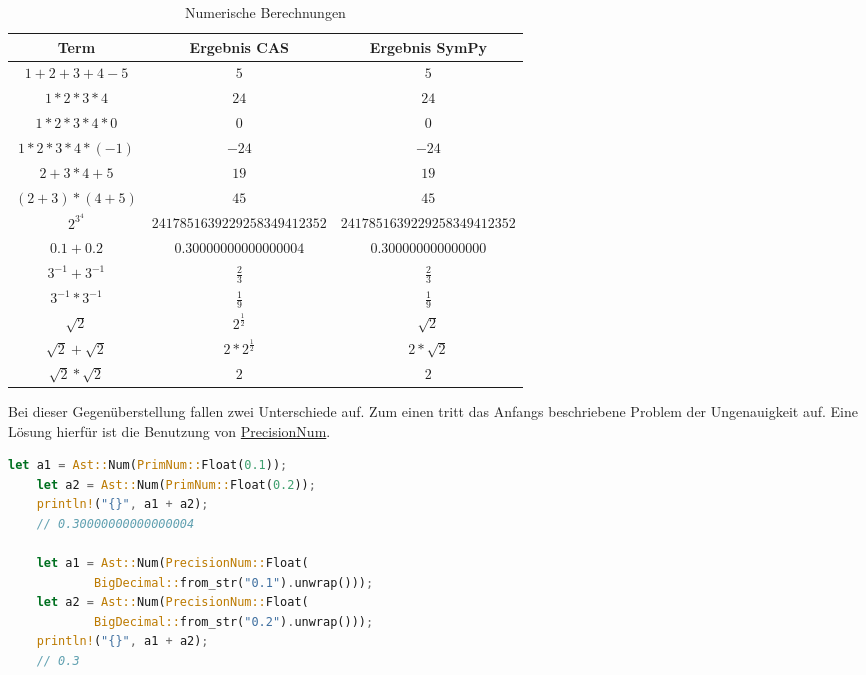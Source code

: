 \documentclass[11pt,a4paper, ngerman]{article}
\begin{document}
\begin{table}[h!]
    \caption{Numerische Berechnungen}
    \centering
    \begin{tabular}{|c|c|c|}
        \hline
        \textbf{Term} & \textbf{Ergebnis CAS} & \textbf{Ergebnis SymPy} \\
        \hline
        $1+2+3+4-5$ & $5$ & $5$ \\
        \hline
        $1*2*3*4$ & $24$ & $24$ \\
        \hline
        $1*2*3*4*0$ & $0$ & $0$ \\
        \hline
        $1*2*3*4*(-1)$ & $-24$ & $-24$ \\
        \hline
        $2+3*4+5$ & $19$ & $19$ \\
        \hline
        $(2+3)*(4+5)$ & $45$ & $45$ \\
        \hline
        $2^{3^4}$ & $2417851639229258349412352$ & $2417851639229258349412352$ \\
        \hline
        $0.1+0.2$ & $0.30000000000000004$ & $0.300000000000000$ \\
        \hline
        $3^{-1} + 3^{-1}$ & $\frac{2}{3}$ & $\frac{2}{3}$ \\
        \hline
        $3^{-1} * 3^{-1}$ & $\frac{1}{9}$ & $\frac{1}{9}$ \\
        \hline
        $\sqrt{2}$ & $2^\frac{1}{2}$ & $\sqrt{2}$ \\
        \hline
        $\sqrt{2}+\sqrt{2}$ & $2*2^\frac{1}{2}$ &  $2*\sqrt{2}$ \\
        \hline
        $\sqrt{2}*\sqrt{2}$ & $2$ & $2$ \\
        \hline
    \end{tabular}
\end{table}

Bei dieser Gegenüberstellung fallen zwei Unterschiede auf. Zum einen tritt das Anfangs beschriebene Problem der Ungenauigkeit auf. Eine Lösung hierfür ist die Benutzung von \hyperref[sec:NumTypes]{PrecisionNum}.

\begin{lstlisting}[language=rust, caption={PrimNum vs. PrecisionNum}]
    let a1 = Ast::Num(PrimNum::Float(0.1));
    let a2 = Ast::Num(PrimNum::Float(0.2));
    println!("{}", a1 + a2);
    // 0.30000000000000004

    let a1 = Ast::Num(PrecisionNum::Float(
            BigDecimal::from_str("0.1").unwrap()));
    let a2 = Ast::Num(PrecisionNum::Float(
            BigDecimal::from_str("0.2").unwrap()));
    println!("{}", a1 + a2);
    // 0.3
\end{lstlisting}
\end{document}

